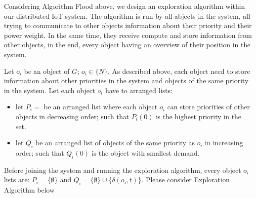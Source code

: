 \documentclass[../main/Self-Stabilization.tex]{subfiles}
\begin{document}
Considering Algorithm Flood above, we design an exploration algorithm within our distributed IoT system. The algorithm is run by all abjects in the system, all trying to communicate to other objects information about their priority and their power weight. In the same time, they receive compute and store information from other objects, in the end, every object having an overview of their position in the system.

Let $o_{i}$ be an object of $G$; $o_{i} \in\{N\}$. As described above, each object need to store information about other priorities in the system and objects of the same priority in the system. Let each object $o_{i}$ have to arranged lists:
\begin{itemize}
    \item let $P_{i}=$ be an arranged list where each object $o_{i}$ can store priorities of other objects in decreasing order; such that $P_{i}(0)$ is the highest priority in the set.
    \item let $Q_{i}$ be an arranged list of objects of the same priority as $o_{i}$ in increasing order; such that $Q_{i}(0)$ is the object with smallest demand.
\end{itemize}

Before joining the system and running the exploration algorithm, every object $o_{i}$ lists are: $P_{i}=\{\emptyset\}$ and $Q_{i}=\{\emptyset\}\cup\{\delta(o_{i},t)\}$. Please consider Exploration Algorithm below
\end{document}
